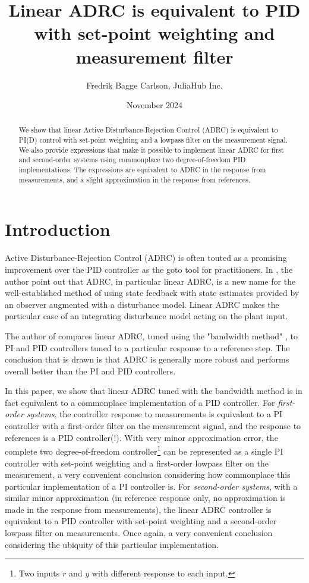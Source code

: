 \documentclass[letterpaper, 10 pt, conference]{ieeeconf}
\title{Linear ADRC is equivalent to PID with set-point weighting and measurement filter}
\author{Fredrik Bagge Carlson, JuliaHub Inc.}
\date{November 2024}
\begin{document}
\maketitle

\begin{abstract}
We show that linear Active Disturbance-Rejection Control (ADRC) is equivalent to PI(D) control with set-point weighting and a lowpass filter on the measurement signal. We also provide expressions that make it possible to implement linear ADRC for first and second-order systems using commonplace two degree-of-freedom PID implementations. The expressions are equivalent to ADRC in the response from measurements, and a slight approximation in the response from references.
\end{abstract}


\section{Introduction}
Active Disturbance-Rejection Control (ADRC) is often touted as a promising improvement over the PID controller as the goto tool for practitioners. In \cite{herbst2013simulative}, the author point out that ADRC, in particular linear ADRC, is a new name for the well-established method of using state feedback with state estimates provided by an observer augmented with a disturbance model. Linear ADRC makes the particular case of an integrating disturbance model acting on the plant input. 

The author of \cite{herbst2013simulative} compares linear ADRC, tuned using the "bandwidth method" \cite{gao2003scaling}, to PI and PID controllers tuned to a particular response to a reference step. The conclusion that is drawn is that ADRC is generally more robust and performs overall better than the PI and PID controllers.

In this paper, we show that linear ADRC tuned with the bandwidth method is in fact equivalent to a commonplace implementation of a PID controller. For \emph{first-order systems}, the controller response to measurements is equivalent to a PI controller with a first-order filter on the measurement signal, and the response to references is a PID controller(!). With very minor approximation error, the complete two degree-of-freedom controller\footnote{Two inputs $r$ and $y$ with different response to each input.} can be represented as a single PI controller with set-point weighting and a first-order lowpass filter on the measurement, a very convenient conclusion considering how commonplace this particular implementation of a PI controller is. For \emph{second-order systems}, with a similar minor approximation (in reference response only, no approximation is made in the response from measurements), the linear ADRC controller is equivalent to a PID controller with set-point weighting and a second-order lowpass filter on measurements. Once again, a very convenient conclusion considering the ubiquity of this particular implementation.
\end{document}
